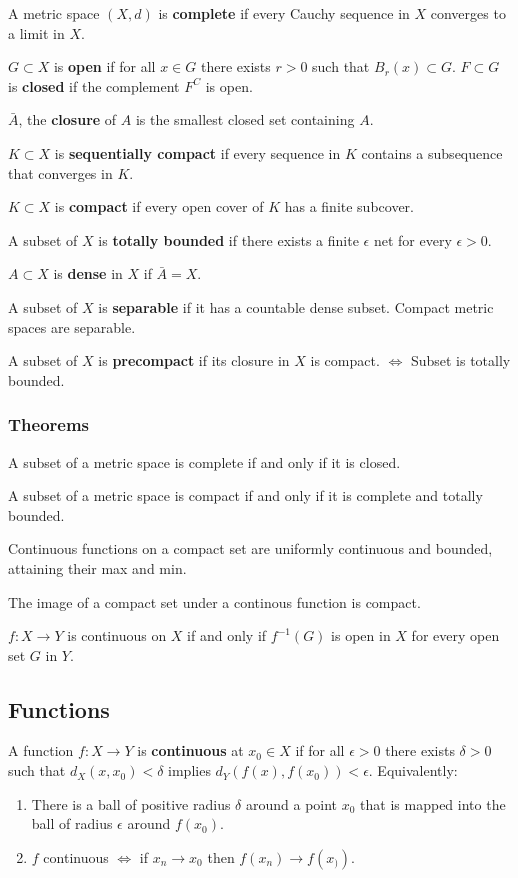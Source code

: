 \documentclass[12pt]{article}
\begin{document}
A metric space $(X, d)$ is \textbf{complete} if every Cauchy sequence in $X$
converges to a limit in $X$.

$G \subset X$ is \textbf{open} if for all $x \in G$ there exists $r > 0$
such that $B_r (x) \subset G$. $F \subset G$ is \textbf{closed} if the complement
$F^C$ is open.

$\bar{A}$, the \textbf{closure} of $A$ is the smallest closed set
containing $A$.

$K \subset X$ is \textbf{sequentially compact} if every sequence in $K$
contains a subsequence that converges in $K$.

$K \subset X$ is \textbf{compact} if every open cover of $K$ has a finite
subcover.

A subset of $X$ is \textbf{totally bounded} if there exists a finite
$\epsilon$ net for every $\epsilon > 0$.

$A \subset X$ is \textbf{dense} in $X$ if $\bar{A} = X$.

A subset of $X$ is \textbf{separable} if it has a countable dense subset.
Compact metric spaces are separable.

A subset of $X$ is \textbf{precompact} if its closure in $X$ is compact. 
$\iff$ Subset is totally bounded.


\subsubsection{Theorems}

A subset of a metric space is complete if and only if it is closed.

A subset of a metric space is compact if and only if it is complete and
totally bounded.

Continuous functions on a compact set are uniformly continuous and bounded,
attaining their max and min.

The image of a compact set under a continous function is compact.

$f: X \rightarrow Y$ is continuous on $X$ if and only if $f^{-1}(G)$ is
open in $X$ for every open set $G$ in $Y$.

\subsection{Functions}

A function $f : X \rightarrow Y$ is \textbf{continuous} at $x_0 \in X$ if
for all $\epsilon > 0$ there exists $\delta > 0$ such that $d_X(x, x_0) <
\delta$ implies $d_Y(f(x), f(x_0)) < \epsilon$. Equivalently:
\begin{enumerate}
    \item There is a ball of positive radius $\delta$
    around a point $x_0$ that is mapped into the ball of radius $\epsilon$ around
    $f(x_0)$.
    \item $f$ continuous $\iff$ if $x_n \rightarrow x_0$ then $f(x_n)
\rightarrow f(x_))$.
\end{enumerate}
\end{document}
